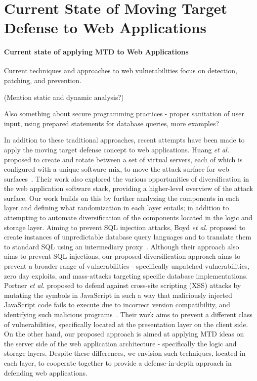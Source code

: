 \section{Current State of Moving Target Defense to Web Applications}
\paragraph{Current state of applying MTD to Web Applications}
Current techniques and approaches to web vulnerabilities focus on detection, patching, and prevention. 

(Mention static and dynamic analysis?)

Also something about secure programming practices - proper sanitation of user input, using prepared statements for database queries, more examples?
 
In addition to these traditional approaches, recent attempts have been made to apply the moving target defense concept to web applications.
Huang \textit{et al.} proposed to create and rotate between a set of virtual servers, each of which is configured with a unique software mix,
to move the attack surface for web surfaces~\cite{huang2011}. 
Their work also explored the various opportunities of diversification in the web application software stack, providing a higher-level overview of the attack surface.
Our work builds on this by further analyzing the components in each layer and defining what randomization in each layer entails; in addition to attempting to automate diversification  of the components located in the logic and storage layer.
Aiming to prevent SQL injection attacks, Boyd \textit{et al.} proposed to create instances of unpredictable database query languages and to translate them to standard SQL using an intermediary proxy~\cite{boyd2004}. 
Although their approach also aims to prevent SQL injections, our proposed diversification approach aims to prevent a broader range of vulnerabilities---specifically unpatched vulnerabilities, zero day exploits, and mass-attacks targeting specific database implementations.
Portner \textit{et al.} proposed to defend against cross-site scripting (XSS) attacks by mutating the symbols in JavaScript in such a way that maliciously injected JavaScript code fails to execute due to incorrect version compatibility, and identifying such malicious programs~\cite{portner2014}.
Their work aims to prevent a different class of vulnerabilities, specifically located at the presentation layer on the client side. On the other hand, our proposed approach is aimed at applying MTD ideas on the server side of the web application architecture - specifically the logic and storage layers.
Despite these differences, we envision such techniques, located in each layer, to cooperate together to provide a defense-in-depth approach in defending web applications.